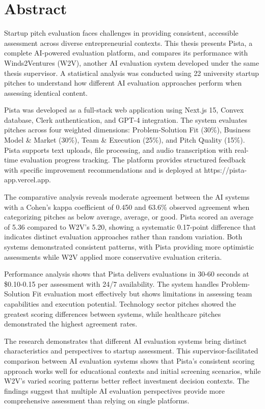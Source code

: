 \chapter*{Abstract}
Startup pitch evaluation faces challenges in providing consistent, accessible assessment across diverse entrepreneurial contexts. This thesis presents Pista, a complete AI-powered evaluation platform, and compares its performance with Winds2Ventures (W2V), another AI evaluation system developed under the same thesis supervisor. A statistical analysis was conducted using 22 university startup pitches to understand how different AI evaluation approaches perform when assessing identical content.

Pista was developed as a full-stack web application using Next.js 15, Convex database, Clerk authentication, and GPT-4 integration. The system evaluates pitches across four weighted dimensions: Problem-Solution Fit (30\%), Business Model \& Market (30\%), Team \& Execution (25\%), and Pitch Quality (15\%). Pista supports text uploads, file processing, and audio transcription with real-time evaluation progress tracking. The platform provides structured feedback with specific improvement recommendations and is deployed at https://pista-app.vercel.app.

The comparative analysis reveals moderate agreement between the AI systems with a Cohen's kappa coefficient of 0.450 and 63.6\% observed agreement when categorizing pitches as below average, average, or good. Pista scored an average of 5.36 compared to W2V's 5.20, showing a systematic 0.17-point difference that indicates distinct evaluation approaches rather than random variation. Both systems demonstrated consistent patterns, with Pista providing more optimistic assessments while W2V applied more conservative evaluation criteria.

Performance analysis shows that Pista delivers evaluations in 30-60 seconds at \$0.10-0.15 per assessment with 24/7 availability. The system handles Problem-Solution Fit evaluation most effectively but shows limitations in assessing team capabilities and execution potential. Technology sector pitches showed the greatest scoring differences between systems, while healthcare pitches demonstrated the highest agreement rates.

The research demonstrates that different AI evaluation systems bring distinct characteristics and perspectives to startup assessment. This supervisor-facilitated comparison between AI evaluation systems shows that Pista's consistent scoring approach works well for educational contexts and initial screening scenarios, while W2V's varied scoring patterns better reflect investment decision contexts. The findings suggest that multiple AI evaluation perspectives provide more comprehensive assessment than relying on single platforms.

